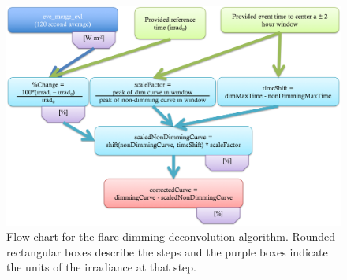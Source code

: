 \begin{figure}[!h]
    \begin{center}
	    \includegraphics[width=160mm]{Images/DeconvolutionMethod.png}
    \end{center}
    \caption[Flare-dimming deconvolution algorithm schematic]{
        Flow-chart for the flare-dimming deconvolution algorithm. Rounded-rectangular boxes describe the steps and the 
        purple boxes indicate the units of the irradiance at that step. 
   	}
    \label{flaredimmingdeconvolutionalgorithm}
\end{figure}


